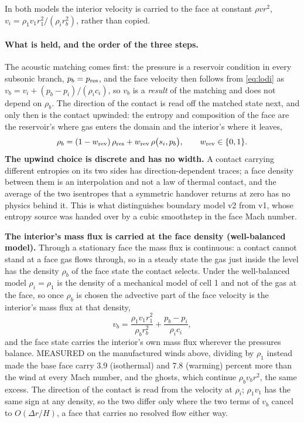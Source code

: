 In both models the interior velocity is carried to the face at constant
$\rho v r^2$, $v_i = \rho_1v_1r_1^2/(\rho_i r_b^2)$, rather than copied.

\paragraph{What is held, and the order of the three steps.}
The acoustic matching comes first: the pressure is a reservoir condition in
every subsonic branch, $p_b = p_{\rm res}$, and the face velocity then
follows from \eqref{eq:lodi} as $v_b = v_i + (p_b-p_i)/(\rho_ic_i)$, so
$v_b$ is a \emph{result} of the matching and does not depend on $\rho_b$.
The direction of the contact is read off the matched state next, and only
then is the contact upwinded: the entropy and composition of the face are
the reservoir's where gas enters the domain and the interior's where it
leaves,
%
\begin{equation}
  \rho_b = (1-w_{\rm rev})\,\rho_{\rm res}
         + w_{\rm rev}\,\rho\bigl(s_i, p_b\bigr),
  \qquad w_{\rm rev} \in \{0,1\}.
  \label{eq:contact_upwind}
\end{equation}
%
\textbf{The upwind choice is discrete and has no width.}  A contact carrying
different entropies on its two sides has direction-dependent traces; a face
density between them is an interpolation and not a law of thermal contact,
and the average of the two isentropes that a symmetric handover returns at
zero has no physics behind it.  This is what distinguishes boundary model v2
from v1, whose entropy source was handed over by a cubic smoothstep in the
face Mach number.

\textbf{The interior's mass flux is carried at the face density (well-balanced
model).}  Through a stationary face the mass flux is continuous: a contact
cannot stand at a face gas flows through, so in a steady state the gas just
inside the level has the density $\rho_b$ of the face state the contact
selects.  Under the well-balanced model $\rho_i = \rho_1$ is the density of a
mechanical model of cell 1 and not of the gas at the face, so once $\rho_b$
is chosen the advective part of the face velocity is the interior's mass
flux at that density,
%
\begin{equation}
  v_b = \frac{\rho_1 v_1 r_1^2}{\rho_b r_b^2} + \frac{p_b - p_i}{\rho_ic_i},
  \label{eq:vb_mass_flux}
\end{equation}
%
and the face state carries the interior's own mass flux wherever the
pressures balance.  MEASURED on the manufactured winds above, dividing by
$\rho_1$ instead made the base face carry 3.9 (isothermal) and 7.8 (warming)
percent more than the wind at every Mach number, and the ghosts, which
continue $\rho_bv_br^2$, the same excess.  The direction of the contact is
read from the velocity at $\rho_i$; $\rho_1v_1$ has the same sign at any
density, so the two differ only where the two terms of $v_b$ cancel to
$O(\Delta r/H)$, a face that carries no resolved flow either way.

